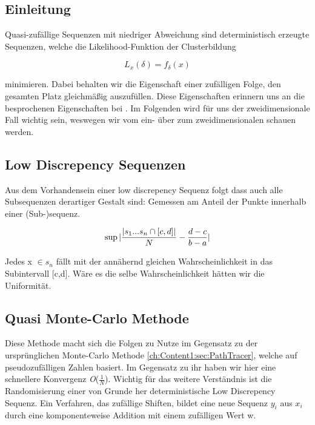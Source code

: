 \cite{owen1998scrambling} \cite{heitz:hal02150657}


\subsection{Einleitung}
Quasi-zufällige Sequenzen mit niedriger Abweichung sind deterministisch 
erzeugte Sequenzen, welche die Likelihood-Funktion der Clusterbildung

\begin{equation}\label{eq:Likeli-Hood-Gleichung}
    L_{x}(\delta) = f_{\delta}(x)
\end{equation}

minimieren. Dabei behalten wir die Eigenschaft einer zufälligen Folge, 
den gesamten Platz gleichmäßig auszufüllen. Diese Eigenschaften erinnern
uns an die besprochenen Eigenschaften bei .
Im Folgenden wird für uns der zweidimensionale Fall wichtig sein, weswegen
wir vom ein- über zum zweidimensionalen schauen werden.

\subsection{Low Discrepency Sequenzen}
Aus dem Vorhandensein einer low discrepency Sequenz folgt dass auch alle 
Subsequenzen derartiger Gestalt sind: Gemessen am Anteil der Punkte innerhalb
einer (Sub-)sequenz.

\begin{equation}\label{eq:Low Discrepency}
    \sup{\lvert\frac{\lvert s_{1}...s_{n} \cap [c,d]\rvert}{N} - \frac{d-c}{b-a}\rvert}
\end{equation}

Jedes x $\in s_{n}$ fällt mit der annähernd gleichen Wahrscheinlichkeit
in das Subintervall [c,d]. Wäre es die selbe Wahrscheinlichkeit hätten 
wir die Uniformität.

\label{sec:quasi monte carlo}
\subsection{Quasi Monte-Carlo Methode}
Diese Methode macht sich die  Folgen zu Nutze
im Gegensatz zu der ursprünglichen Monte-Carlo Methode \ref{ch:Content1:sec:PathTracer},
welche auf pseudozufälligen Zahlen basiert. Im Gegensatz zu ihr haben wir 
hier eine schnellere Konvergenz \textit{O}($\frac{1}{N}$).
Wichtig für das weitere Verständnis ist die Randomisierung einer von Grunde
her deterministische Low Discrepency Sequenz. Ein Verfahren, das 
zufällige Shiften, bildet eine neue Sequenz $y_{i}$ aus $x_{i}$ durch 
eine komponenteweise Addition mit einem zufälligen Wert w.

